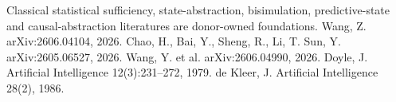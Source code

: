 \markdownRendererDocumentBegin
\markdownRendererSectionBegin
{}\markdownRendererInterblockSeparator
{}\markdownRendererUlBeginTight
\markdownRendererUlItem Classical statistical sufficiency, state-abstraction, bisimulation, predictive-state and causal-abstraction literatures are donor-owned foundations.\markdownRendererUlItemEnd 
\markdownRendererUlItem Wang, Z.  arXiv:2606.04104, 2026.\markdownRendererUlItemEnd 
\markdownRendererUlItem Chao, H., Bai, Y., Sheng, R., Li, T. \markdownRendererAmpersand{} Sun, Y.  arXiv:2605.06527, 2026.\markdownRendererUlItemEnd 
\markdownRendererUlItem Wang, Y. et al.  arXiv:2606.04990, 2026.\markdownRendererUlItemEnd 
\markdownRendererUlItem Doyle, J.  Artificial Intelligence 12(3):231–272, 1979.\markdownRendererUlItemEnd 
\markdownRendererUlItem de Kleer, J.  Artificial Intelligence 28(2), 1986.\markdownRendererUlItemEnd 
\markdownRendererUlEndTight 
\markdownRendererSectionEnd \markdownRendererDocumentEnd